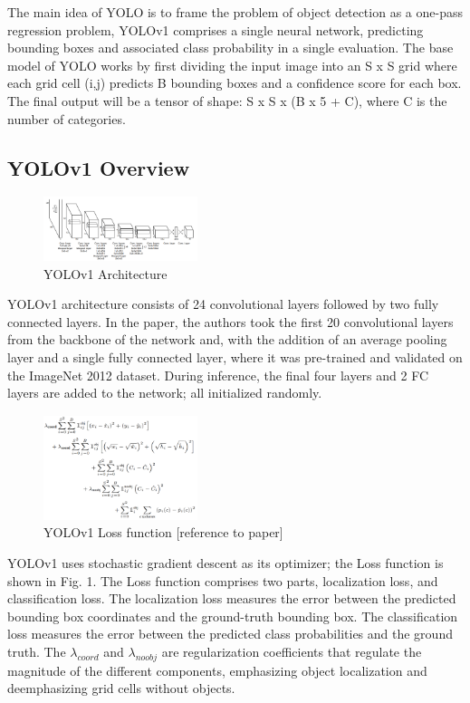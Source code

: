 \documentclass[10pt,twocolumn,letterpaper]{article}
\begin{document}
The main idea of YOLO is to frame the problem of object detection as a one-pass regression problem, YOLOv1 comprises a single neural network, predicting bounding boxes and associated class probability in a single evaluation. The base model of YOLO works by first dividing the input image into an S x S grid where each grid cell (i,j) predicts B bounding boxes and a confidence score for each box. The final output will be a tensor of shape: S x S x (B x 5 + C), where C is the number of categories.


\subsection{YOLOv1 Overview}

\begin{figure}[h]
    \centering
    \includegraphics[width=0.4\textwidth]{figures/YOLOv1 Architecture.png}
    \caption{YOLOv1 Architecture}
    \label{fig:my_label}
\end{figure}


YOLOv1 architecture consists of 24 convolutional layers followed by two fully connected layers. In the paper, the authors took the first 20 convolutional layers from the backbone of the network and, with the addition of an average pooling layer and a single fully connected layer, where it was pre-trained and validated on the ImageNet 2012 dataset. During inference, the final four layers and 2 FC layers are added to the network; all initialized randomly.


\begin{figure}[h]
    \centering
    \includegraphics[width=0.4\textwidth]{figures/YOLO_Loss.png}
    \caption{YOLOv1 Loss function [reference to paper]}
    \label{fig:YOLO_Loss}
\end{figure}

YOLOv1 uses stochastic gradient descent as its optimizer; the Loss function is shown in Fig. 1. The Loss function comprises two parts, localization loss, and classification loss. The localization loss measures the error between the predicted bounding box coordinates and the ground-truth bounding box. The classification loss measures the error between the predicted class probabilities and the ground truth. The $\lambda_{coord}$ and $\lambda_{noobj}$ are regularization coefficients that regulate the magnitude of the different components, emphasizing object localization and deemphasizing grid cells without objects.  
\end{document}
